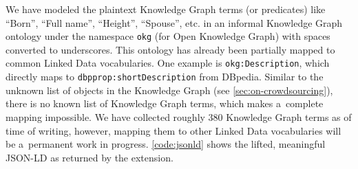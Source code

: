 \documentclass[runningheads,a4paper]{llncs}
\begin{document}

We have modeled the plaintext Knowledge Graph terms (or predicates)
like ``Born'', ``Full name'', ``Height'', ``Spouse'', etc.
in an informal Knowledge Graph ontology under the namespace \texttt{okg}
(for Open Knowledge Graph) with spaces converted to underscores.
This ontology has already been partially mapped to common Linked Data vocabularies.
One example is \texttt{okg:Description},
which directly maps to \texttt{dbpprop:shortDescription} from DBpedia.
Similar to the unknown list of objects in the Knowledge Graph (see \autoref{sec:on-crowdsourcing}),
there is no known list of Knowledge Graph terms,
which makes a~complete mapping impossible.
We have collected roughly 380 Knowledge Graph terms
as of time of writing, however, mapping them to other Linked Data vocabularies
will be a~permanent work in progress.
\autoref{code:jsonld} shows the lifted, meaningful JSON-LD as returned by the extension.
\end{document}
